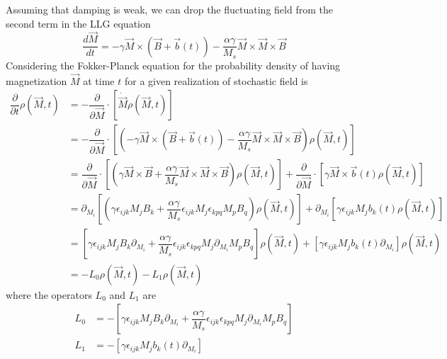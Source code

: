 \documentclass[aps,prb,onecolumn,notitlepage,showpacs,floatfix,superscriptaddress]{revtex4-1}
\begin{document}
Assuming that damping is weak, we can drop the fluctuating field from the second term in the LLG equation
\begin{equation}
\dfrac{d\vec{M}}{dt} = -\gamma \vec{M} \times (\vec{B}+\vec{b}(t)) -\dfrac{\alpha \gamma}{M_s} \vec{M} \times \vec{M} \times \vec{B}
\end{equation}
Considering the Fokker-Planck equation for the probability density of having magnetization $\vec{M}$ at time $t$ for a given realization of stochastic field is
\begin{equation}
\begin{split}
\dfrac{\partial}{\partial t}  \rho(\vec{M},t) &= - \dfrac{\partial}{\partial \vec{M}} \cdot [\dot{\vec{M}} \rho(\vec{M},t)] \\
 &= - \dfrac{\partial}{\partial \vec{M}} \cdot \left[\left(-\gamma \vec{M} \times (\vec{B}+\vec{b}(t)) -\dfrac{\alpha \gamma}{M_s} \vec{M} \times \vec{M} \times \vec{B}\right) \rho(\vec{M},t) \right]  \\
 &=  \dfrac{\partial}{\partial \vec{M}} \cdot \left[\left(\gamma \vec{M} \times \vec{B} +\dfrac{\alpha \gamma}{M_s} \vec{M} \times \vec{M} \times \vec{B}\right) \rho(\vec{M},t) \right] +  \dfrac{\partial}{\partial \vec{M}} \cdot \left[\gamma \vec{M} \times \vec{b}(t)\rho(\vec{M},t) \right]\\
 &=  \partial_{M_i} \left[\left(\gamma \epsilon_{ijk}M_j B_k +\dfrac{\alpha \gamma}{M_s} \epsilon_{ijk}M_j \epsilon_{kpq}M_p B_q \right) \rho(\vec{M},t) \right] +  \partial_{M_i} \left[\gamma \epsilon_{ijk} M_j b_k(t) \rho(\vec{M},t) \right]\\
 &=  \left[\gamma \epsilon_{ijk}M_j B_k \partial_{M_i} +\dfrac{\alpha \gamma}{M_s} \epsilon_{ijk} \epsilon_{kpq} M_j \partial_{M_i} M_p B_q \right]  \rho(\vec{M},t) +   \left[\gamma \epsilon_{ijk} M_j b_k(t) \partial_{M_i}\right] \rho(\vec{M},t) \\
 &= -L_0  \rho(\vec{M},t) - L_1  \rho(\vec{M},t)
\end{split}
\end{equation}
where the operators $L_0$ and $L_1$ are 
\begin{equation}
\begin{split}
L_0 &= -\left[\gamma \epsilon_{ijk}M_j B_k \partial_{M_i} +\dfrac{\alpha \gamma}{M_s} \epsilon_{ijk} \epsilon_{kpq} M_j \partial_{M_i} M_p B_q \right] \\
L_1 &=-\left[\gamma \epsilon_{ijk} M_j b_k(t) \partial_{M_i}\right]\\
\end{split}
\end{equation}
\end{document}
